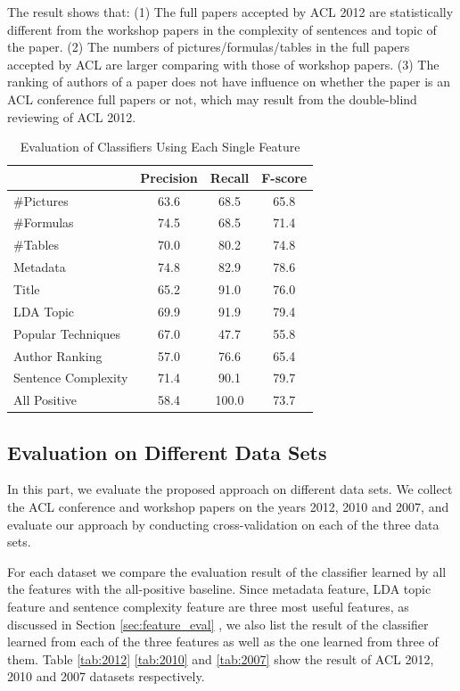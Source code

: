 \documentclass[11pt,letterpaper]{article}
\begin{document}
The result shows that:
(1) The full papers accepted by ACL 2012 are statistically 
different from the workshop papers in the complexity of sentences and topic of the paper.
(2) The numbers of pictures/formulas/tables in the full papers accepted by ACL are larger
comparing with those of workshop papers.
(3) The ranking of authors of a paper does not have influence on whether the paper 
is an ACL conference full papers or not, 
which may result from the double-blind reviewing of ACL 2012. 

\begin{table}
\begin{center}
\begin{tabular}{|p{2cm}|c|c|c|}
\hline 
& \bf Precision & \bf Recall & \bf F-score \\ \hline
\#Pictures & 63.6 & 68.5 & 65.8 \\ \hline
\#Formulas	& 74.5	& 68.5	& 71.4\\ \hline
\#Tables	&70.0 &	80.2	& 74.8\\ \hline
Metadata	& 74.8	& 82.9	& 78.6\\ \hline
Title	& 65.2	& 91.0 &	76.0\\ \hline
LDA Topic &	69.9	&91.9&	79.4\\ \hline
Popular Techniques	& 67.0	& 47.7	&55.8\\ \hline
Author Ranking	& 57.0	& 76.6	& 65.4\\ \hline
Sentence Complexity	& 71.4	& 90.1 &	79.7\\ \hline
All Positive	& 58.4	& 100.0	& 73.7\\\hline
\end{tabular}
\end{center}
\label{tab:feature_eval}
\caption{Evaluation of Classifiers Using Each Single Feature}
\end{table}



\subsection{Evaluation on Different Data Sets}
In this part, we evaluate the proposed approach on different data sets.
We collect the ACL conference and workshop papers on the years 2012, 2010 and 2007,
and evaluate our approach by conducting cross-validation on each of the three data sets.

For each dataset we compare the evaluation result of the classifier learned by all the features with the all-positive baseline.
Since metadata feature, LDA topic feature and sentence complexity feature are three most useful features, as discussed in Section \ref{sec:feature_eval}
, we also list the result of the classifier learned from each of the three features as well as the one learned from three of them. 
Table \ref{tab:2012} \ref{tab:2010} and \ref{tab:2007} show the result of ACL 2012, 2010 and 2007 datasets respectively.
\end{document}
